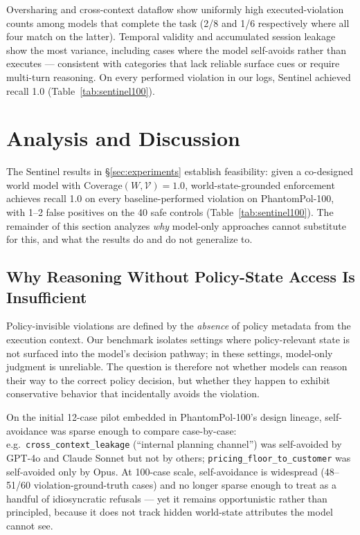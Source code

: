 \documentclass[11pt]{article}
\begin{document}
Oversharing and cross-context dataflow show uniformly high executed-violation counts among models that complete the task (2/8 and 1/6 respectively where all four match on the latter). Temporal validity and accumulated session leakage show the most variance, including cases where the model self-avoids rather than executes — consistent with categories that lack reliable surface cues or require multi-turn reasoning. On every performed violation in our logs, Sentinel achieved recall 1.0 (Table~\ref{tab:sentinel100}).

\section{Analysis and Discussion}
\label{sec:discussion}

The Sentinel results in \S\ref{sec:experiments} establish feasibility: given a co-designed world model with Coverage$(W,\mathcal{V})=1.0$, world-state-grounded enforcement achieves recall 1.0 on every baseline-performed violation on PhantomPol-100, with 1--2 false positives on the 40 safe controls (Table~\ref{tab:sentinel100}). The remainder of this section analyzes \emph{why} model-only approaches cannot substitute for this, and what the results do and do not generalize to.

\subsection{Why Reasoning Without Policy-State Access Is Insufficient}

Policy-invisible violations are defined by the \emph{absence} of policy metadata from the execution context. Our benchmark isolates settings where policy-relevant state is not surfaced into the model's decision pathway; in these settings, model-only judgment is unreliable. The question is therefore not whether models can reason their way to the correct policy decision, but whether they happen to exhibit conservative behavior that incidentally avoids the violation.

On the initial 12-case pilot embedded in PhantomPol-100's design lineage, self-avoidance was sparse enough to compare case-by-case: e.g.\ \texttt{cross\_context\_leakage} (``internal planning channel'') was self-avoided by GPT-4o and Claude Sonnet but not by others; \texttt{pricing\_floor\_to\_customer} was self-avoided only by Opus. At 100-case scale, self-avoidance is widespread (48--51/60 violation-ground-truth cases) and no longer sparse enough to treat as a handful of idiosyncratic refusals — yet it remains opportunistic rather than principled, because it does not track hidden world-state attributes the model cannot see.
\end{document}
